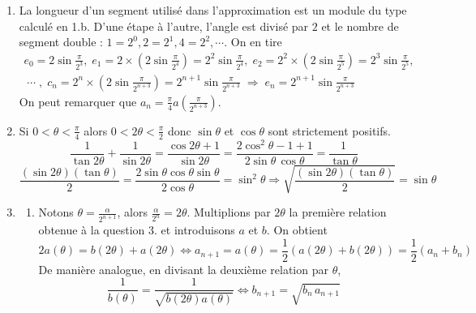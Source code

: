 \begin{enumerate}
  \item La longueur d'un segment utilisé dans l'approximation est un module du type calculé en 1.b. D'une étape à l'autre, l'angle est divisé par $2$ et le nombre de segment double  : $1=2^0, 2=2^1, 4=2^2, \cdots$. On en tire
\begin{multline*}
  e_0 = 2\sin\frac{\pi}{2^3},\; e_1 = 2\times(2\sin\frac{\pi}{2^4})=2^2\sin\frac{\pi}{2^4},\;
  e_2 = 2^2\times(2\sin\frac{\pi}{2^5}) = 2^3\sin\frac{\pi}{2^5},\\
  \;\cdots\;,\;
  c_n = 2^n\times(2\sin\frac{\pi}{2^{n+3}}) = 2^{n+1}\sin\frac{\pi}{2^{n+3}} \; 
  \Rightarrow \; e_n = 2^{n+1}\sin\frac{\pi}{2^{n+3}}
\end{multline*}
On peut remarquer que $a_n = \frac{\pi}{4}a(\frac{\pi}{2^{n+3}})$. 
  \item Si $0 < \theta < \frac{\pi}{4}$ alors $0 < 2\theta < \frac{\pi}{2}$ donc $\sin \theta$ et $\cos \theta$ sont strictement positifs.
\begin{displaymath}
  \frac{1}{\tan 2\theta} + \frac{1}{\sin 2\theta}
=\frac{\cos 2\theta + 1}{\sin 2\theta} = \frac{2\cos^2 \theta -1 + 1}{2\sin \theta \, \cos \theta} = \frac{1}{\tan \theta}
\end{displaymath}
\begin{displaymath}
  \frac{(\sin 2\theta)(\tan \theta)}{2} = \frac{2\sin \theta \cos \theta \sin \theta}{2 \cos \theta} = \sin^2 \theta
\Rightarrow
\sqrt{\frac{(\sin 2\theta)(\tan \theta)}{2}}= \sin \theta
\end{displaymath}

  \item
\begin{enumerate}
  \item Notons $\theta = \frac{\alpha}{2^{n+1}}$, alors $\frac{\alpha}{2^n}=2\theta$. Multiplions par $2\theta$ la première relation obtenue à la question 3. et introduisons $a$ et $b$. On obtient
\begin{displaymath}
2a(\theta) = b(2\theta) + a(2\theta)\Leftrightarrow a_{n+1} = a(\theta) = \frac{1}{2}\left(a(2\theta) + b(2\theta) \right)=\frac{1}{2}(a_n + b_n)   
\end{displaymath}
De manière analogue, en divisant la deuxième relation par $\theta$,
\begin{displaymath}
\frac{1}{b(\theta)} = \frac{1}{\sqrt{b(2\theta)a(\theta)}}\Leftrightarrow b_{n+1} = \sqrt{b_n\,a_{n+1}}  
\end{displaymath}


\end{enumerate}
\end{enumerate}

